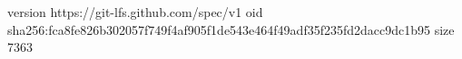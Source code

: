version https://git-lfs.github.com/spec/v1
oid sha256:fca8fe826b302057f749f4af905f1de543e464f49adf35f235fd2dacc9dc1b95
size 7363
